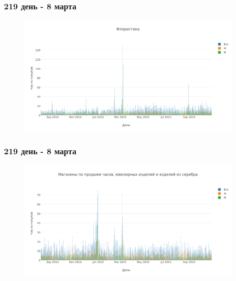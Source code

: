 \documentclass{beamer}
\begin{document}

\begin{frame}
\frametitle{219 день - 8 марта}

\begin{figure}
    \includegraphics[width=1\linewidth]{pics/flowers_8mar.png}
\end{figure}

\end{frame}


\begin{frame}
\frametitle{219 день - 8 марта}

\begin{figure}
    \includegraphics[width=1\linewidth]{pics/jewel_8mar.png}
\end{figure}

\end{frame}

\end{document}
